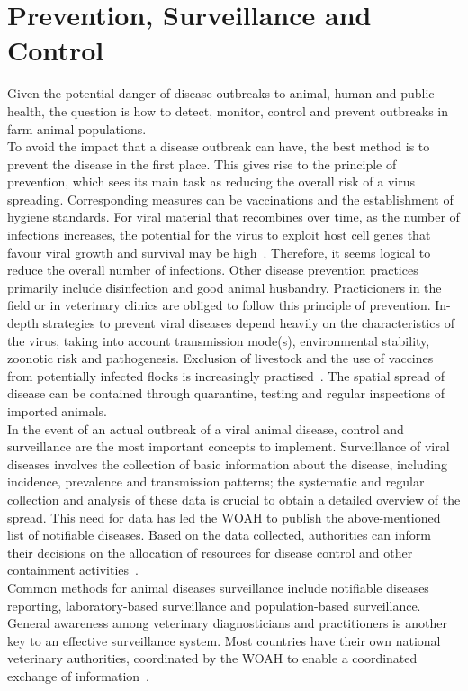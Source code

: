 \section{Prevention, Surveillance and Control}
Given the potential danger of disease outbreaks to animal, human and public health, the question is how to detect, monitor, control and prevent outbreaks in farm animal populations. \\
To avoid the impact that a disease outbreak can have, the best method is to prevent the disease in the first place. This gives rise to the principle of prevention, which sees its main task as reducing the overall risk of a virus spreading. Corresponding measures can be vaccinations and the establishment of hygiene standards. For viral material that recombines over time, as the number of infections increases, the potential for the virus to exploit host cell genes that favour viral growth and survival may be high~\cite{fenner2017maclachlan}. Therefore, it seems logical to reduce the overall number of infections. Other disease prevention practices primarily include disinfection and good animal husbandry. Practicioners in the field or in veterinary clinics are obliged to follow this principle of prevention. In-depth strategies to prevent viral diseases depend heavily on the characteristics of the virus, taking into account transmission mode(s), environmental stability, zoonotic risk and pathogenesis. Exclusion of livestock and the use of vaccines from potentially infected flocks is increasingly practised~\cite{fenner2017maclachlan}. The spatial spread of disease can be contained through quarantine, testing and regular inspections of imported animals. \\
In the event of an actual outbreak of a viral animal disease, control and surveillance are the most important concepts to implement. Surveillance of viral diseases involves the collection of basic information about the disease, including incidence, prevalence and transmission patterns; the systematic and regular collection and analysis of these data is crucial to obtain a detailed overview of the spread. This need for data has led the WOAH to publish the above-mentioned list of notifiable diseases. Based on the data collected, authorities can inform their decisions on the allocation of resources for disease control and other containment activities~\cite{fenner2017maclachlan, who2017one}. \\
Common methods for animal diseases surveillance include notifiable diseases reporting, laboratory-based surveillance and population-based surveillance. General awareness among veterinary diagnosticians and practitioners is another key to an effective surveillance system. Most countries have their own national veterinary authorities, coordinated by the WOAH to enable a coordinated exchange of information~\cite{who2017one}. \\

